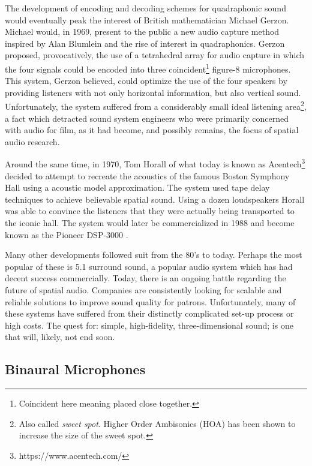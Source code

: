 The development of encoding and decoding schemes for quadraphonic sound would eventually peak the interest of British mathematician Michael Gerzon. Michael would, in 1969, present to the public a new audio capture method inspired by Alan Blumlein and the rise of interest in quadraphonics. Gerzon proposed, provocatively, the use of a tetrahedral array for audio capture in which the four signals could be encoded into three coincident\footnote{Coincident here meaning placed close together.} figure-8 microphones. This system, Gerzon believed, could optimize the use of the four speakers by providing listeners with not only horizontal information, but also vertical sound. Unfortunately, the system suffered from a considerably small ideal listening area\footnote{Also called \textit{sweet spot}. Higher Order Ambisonics (HOA) has been shown to increase the size of the sweet spot.}, a fact which detracted sound system engineers who were primarily concerned with audio for film, as it had become, and possibly remains, the focus of spatial audio research. 

Around the same time, in 1970, Tom Horall of what today is known as Acentech\footnote{https://www.acentech.com/} decided to attempt to recreate the acoustics of the famous Boston Symphony Hall using a acoustic model approximation. The system used tape delay techniques to achieve believable spatial sound. Using a dozen loudspeakers Horall was able to convince the listeners that they were actually being transported to the iconic hall. The system would later be commercialized in 1988 and become known as the Pioneer DSP-3000 \cite{davis2003history}. 

Many other developments followed suit from the 80's to today. Perhaps the most popular of these is 5.1 surround sound, a popular audio system which has had decent success commercially. Today, there is an ongoing battle regarding the future of spatial audio. Companies are consistently looking for scalable and reliable solutions to improve sound quality for patrons. Unfortunately, many of these systems have suffered from their distinctly complicated set-up process or high costs. The quest for: simple, high-fidelity, three-dimensional sound; is one that will, likely, not end soon. 

\subsection{Binaural Microphones}

